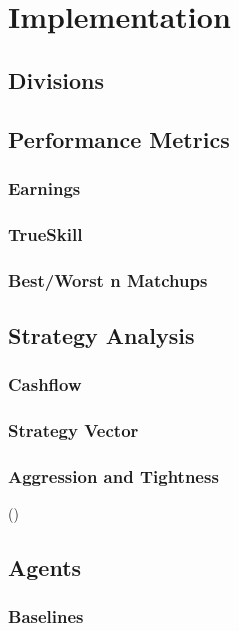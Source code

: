 \chapter{Implementation}

\section{Divisions}


\section{Performance Metrics}

\subsection{Earnings}

\subsection{TrueSkill}

\subsection{Best/Worst n Matchups}


\section{Strategy Analysis}

\subsection{Cashflow}

\subsection{Strategy Vector}

\subsection{Aggression and Tightness}
(\cite{PokerStrategy})


\section{Agents}

\subsection{Baselines}



